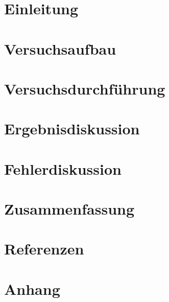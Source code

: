 \documentclass[10pt, a4paper, ngerman]{article}
\begin{document}
\maketitle

\section{Einleitung             }
\section{Versuchsaufbau         }
\section{Versuchsdurchführung   }
\section{Ergebnisdiskussion     }
\section{Fehlerdiskussion       }
\section{Zusammenfassung        }
\section{Referenzen             }
\section{Anhang                 }
\end{document}
